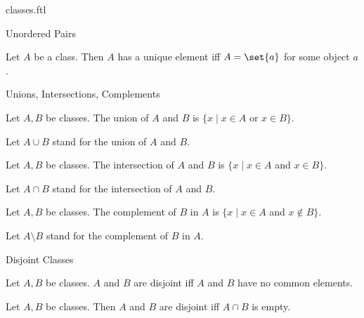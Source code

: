\documentclass{naproche-library}
\begin{document}
\begin{smodule}[title=Classes]{classes.ftl}
\begin{sfragment}{Unordered Pairs}
  \begin{proposition}[forthel,id=FOUNDATIONS_01_0166348647163481]
    Let $A$ be a class.
    Then $A$ has a unique element iff $A = \set{a}$ for some object $a$.
  \end{proposition}
\end{sfragment}

\begin{sfragment}{Unions, Intersections, Complements}
  \begin{definition}[forthel,id=FOUNDATIONS_01_2159753924968448]
    Let $A, B$ be classes.
    The union of $A$ and $B$ is $\{ x \mid x \in A$ or $x \in B \}$.

    Let $A \cup B$ stand for the union of $A$ and $B$.
  \end{definition}

  \begin{definition}[forthel,id=FOUNDATIONS_01_5744033011859456]
    Let $A, B$ be classes.
    The intersection of $A$ and $B$ is $\{ x \mid x \in A$ and $x \in B \}$.

    Let $A \cap B$ stand for the intersection of $A$ and $B$.
  \end{definition}

  \begin{definition}[forthel,id=FOUNDATIONS_01_7620345041256448]
    Let $A, B$ be classes.
    The complement of $B$ in $A$ is $\{ x \mid x \in A$ and $x \notin B \}$.

    Let $A \setminus B$ stand for the complement of $B$ in $A$.
  \end{definition}
\end{sfragment}

\begin{sfragment}{Disjoint Classes}
  \begin{definition}[forthel,id=FOUNDATIONS_01_4981913324355584]
    Let $A, B$ be classes.
    $A$ and $B$ are disjoint iff $A$ and $B$ have no common elements.
  \end{definition}

  \begin{proposition}[forthel,id=FOUNDATIONS_01_1211191546347520]
    Let $A, B$ be classes.
    Then $A$ and $B$ are disjoint iff $A \cap B$ is empty.
  \end{proposition}
\end{sfragment}
\end{smodule}
\end{document}
